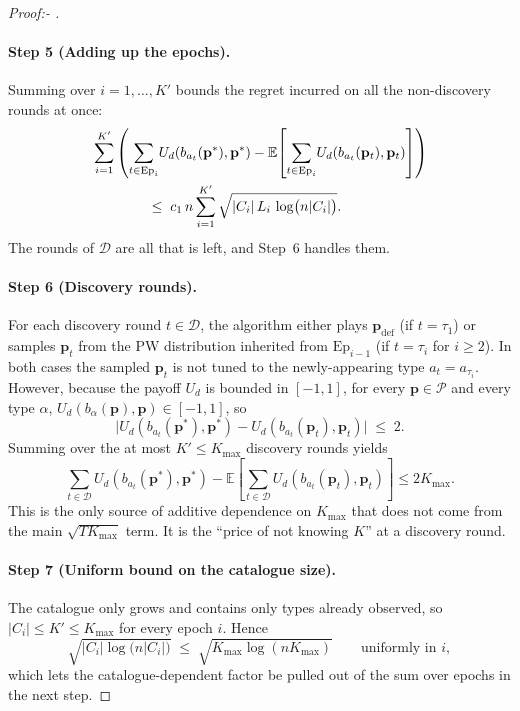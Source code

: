 \documentclass[letterpaper,9pt,twocolumn]{extarticle}
\newcommand{\pvec}{\mathbf{p}}
\newcommand{\cP}{\mathcal{P}}
\newcommand{\EE}{\mathbb{E}}
\newcommand{\Kmax}{K_{\max}}
\theoremstyle{plain}
\theoremstyle{definition}
\theoremstyle{remark}
\begin{document}
\begin{proof}[Proof:- ]
\paragraph{Step 5 (Adding up the epochs).}
Summing  over $i=1,\dots,K'$ bounds the regret
incurred on all the non-discovery rounds at once:
\begin{align}
&\sum_{i=1}^{K'}\left(\sum_{t\in\mathrm{Ep}_i}\!U_d(b_{a_t}(\pvec^{*}),\pvec^{*})
 -\EE\!\left[\sum_{t\in\mathrm{Ep}_i}\!U_d(b_{a_t}(\pvec_t),\pvec_t)\right]\right)\notag\\
&\hspace{4em}\le\;c_1\,n\sum_{i=1}^{K'}\sqrt{|C_i|\,L_i\,\log\bigl(n|C_i|\bigr)}.
\label{eq:epoch-sum}
\end{align}
The rounds of $\mathcal{D}$ are all that is left, and Step~6 handles them.

\paragraph{Step 6 (Discovery rounds).}
For each discovery round $t\in\mathcal{D}$, the algorithm either plays
$\pvec_{\text{def}}$ (if $t=\tau_1$) or samples $\pvec_t$ from the PW
distribution inherited from $\mathrm{Ep}_{i-1}$ (if $t=\tau_i$ for
$i\ge 2$). In both cases the sampled $\pvec_t$ is not tuned to the
newly-appearing type $a_t=a_{\tau_i}$. However, because the payoff
$U_d$ is bounded in $[-1,1]$, for every $\pvec\in\cP$ and every type
$\alpha$, $U_d(b_\alpha(\pvec),\pvec)\in[-1,1]$, so
\begin{equation}
\bigl|U_d(b_{a_t}(\pvec^{*}),\pvec^{*})-U_d(b_{a_t}(\pvec_t),\pvec_t)\bigr|\;\le\;2.
\label{eq:disc-bound}
\end{equation}
Summing  over the at most $K'\le\Kmax$ discovery rounds
yields
\begin{equation}
\sum_{t\in\mathcal{D}}\!U_d(b_{a_t}(\pvec^{*}),\pvec^{*})-\EE\!\left[\sum_{t\in\mathcal{D}}\!U_d(b_{a_t}(\pvec_t),\pvec_t)\right]\le 2\Kmax.
\label{eq:disc-sum}
\end{equation}
This is the only source of additive dependence on $\Kmax$ that does not
come from the main $\sqrt{T\Kmax}$ term. It is the ``price of not knowing
$K$'' at a discovery round.

\paragraph{Step 7 (Uniform bound on the catalogue size).}
The catalogue only grows and contains only types already observed, so
$|C_i|\le K'\le\Kmax$ for every epoch $i$. Hence
\begin{equation}
\sqrt{|C_i|\log\bigl(n|C_i|\bigr)}\;\le\;\sqrt{\Kmax\log (n\Kmax)}
\qquad\text{uniformly in }i,
\label{eq:uniform-Ci}
\end{equation}
which lets the catalogue-dependent factor be pulled out of the sum over
epochs in the next step.


\end{proof}
\end{document}
